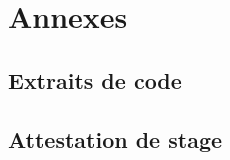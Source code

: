 \documentclass[12pt,a4paper]{report}
\begin{document}
\appendix
\chapter{Annexes}
\section{Extraits de code}


\section{Attestation de stage}

\end{document}
